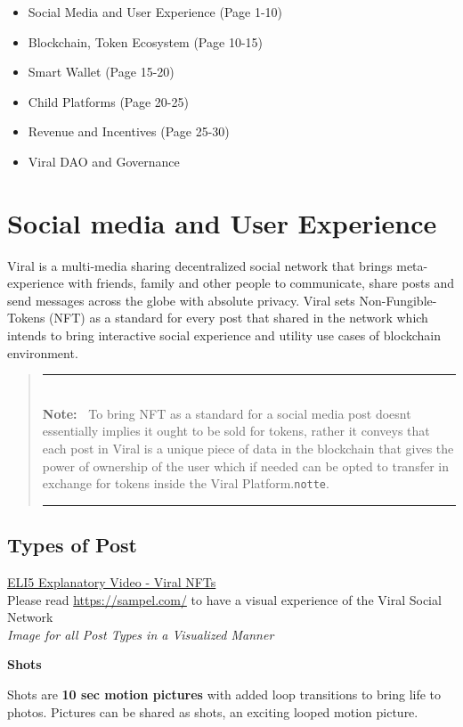 \documentclass[10pt]{article}
\newlength{\Lnote}
\newcommand{\notte}[1]
     {\addtolength{\leftmargini}{1em}
        \settowidth{\Lnote}{\textbf{Note:~}}
        \begin{quote}
            \rule{\dimexpr\textwidth-2\leftmargini}{1pt}\\
                        \mbox{}\hspace{-\Lnote}\textbf{Note:~}%
                                            #1\\[-0.5ex] 
            \rule{\dimexpr\textwidth-2\leftmargini}{1pt}
        \end{quote}
        \addtolength{\leftmargini}{-4em}}
\begin{document}
\begin{itemize}[leftmargin=+0.2in]
\item Social Media and User Experience (Page 1-10)
\item Blockchain, Token Ecosystem (Page 10-15)
\item Smart Wallet (Page 15-20)
\item Child Platforms (Page 20-25)
\item Revenue and Incentives (Page 25-30)
\item Viral DAO  and Governance
\end{itemize}

\section{Social media and User Experience}
Viral is a multi-media sharing decentralized social network that brings meta-experience with friends, family and other people to communicate, share posts and send messages across the globe with absolute privacy. Viral sets Non-Fungible-Tokens (NFT) as a standard for every post that shared in the network which intends to bring interactive social experience and utility use cases of blockchain environment.\\

\notte{To bring NFT as a standard for a social media post doesn\textsc{\char13}t essentially implies it ought to be sold for tokens, rather it conveys that each post in Viral is a unique piece of data in the blockchain that gives the power of ownership of the user which if needed can be opted to transfer in exchange for tokens inside the Viral Platform.\texttt{notte}.}

\subsection{Types of Post}
\hyperlink{https://sample.com}{ELI5 Explanatory Video - Viral NFTs}\\

Please read \hyperlink{App Brouchure}{https://sampel.com/} to have a visual experience of the Viral Social Network\\

\textit{Image for all Post Types in a Visualized Manner}

\textbf{Shots}

Shots are \textbf{10 sec motion pictures} with added loop transitions to bring life to photos. Pictures can be shared as shots, an exciting looped motion picture.\\
\end{document}
